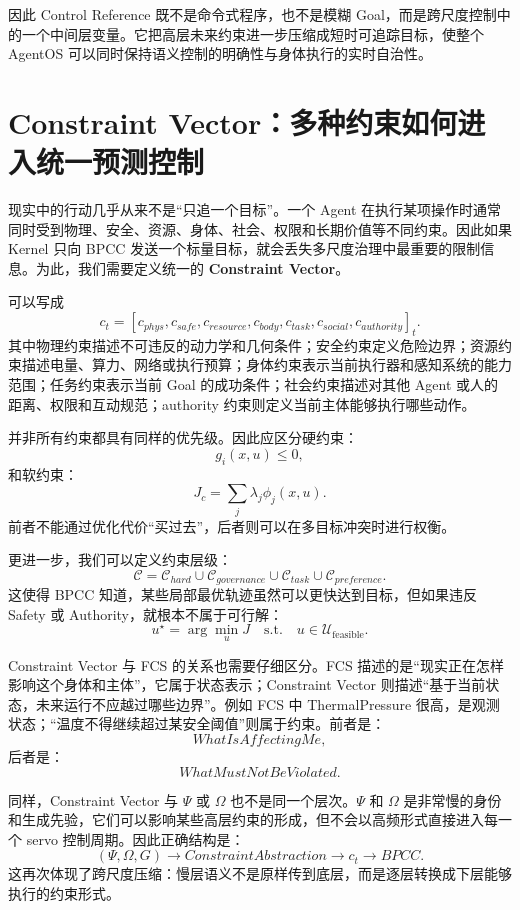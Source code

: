 因此 Control Reference 既不是命令式程序，也不是模糊 Goal，而是跨尺度控制中的一个中间层变量。它把高层未来约束进一步压缩成短时可追踪目标，使整个 AgentOS 可以同时保持语义控制的明确性与身体执行的实时自治性。

\section{Constraint Vector：多种约束如何进入统一预测控制}

现实中的行动几乎从来不是“只追一个目标”。一个 Agent 在执行某项操作时通常同时受到物理、安全、资源、身体、社会、权限和长期价值等不同约束。因此如果 Kernel 只向 BPCC 发送一个标量目标，就会丢失多尺度治理中最重要的限制信息。为此，我们需要定义统一的 \textbf{Constraint Vector}。

可以写成
\[
c_t=
\left[
c_{phys},
c_{safe},
c_{resource},
c_{body},
c_{task},
c_{social},
c_{authority}
\right]_t.
\]
其中物理约束描述不可违反的动力学和几何条件；安全约束定义危险边界；资源约束描述电量、算力、网络或执行预算；身体约束表示当前执行器和感知系统的能力范围；任务约束表示当前 Goal 的成功条件；社会约束描述对其他 Agent 或人的距离、权限和互动规范；authority 约束则定义当前主体能够执行哪些动作。

并非所有约束都具有同样的优先级。因此应区分硬约束：
\[
g_i(x,u)\leq0,
\]
和软约束：
\[
J_c
=
\sum_j\lambda_j
\phi_j(x,u).
\]
前者不能通过优化代价“买过去”，后者则可以在多目标冲突时进行权衡。

更进一步，我们可以定义约束层级：
\[
\mathcal C=
\mathcal C_{hard}
\cup
\mathcal C_{governance}
\cup
\mathcal C_{task}
\cup
\mathcal C_{preference}.
\]
这使得 BPCC 知道，某些局部最优轨迹虽然可以更快达到目标，但如果违反 Safety 或 Authority，就根本不属于可行解：
\[
u^\star
=
\arg\min_u J
\quad
\text{s.t.}\quad
u\in\mathcal U_{\mathrm{feasible}}.
\]

Constraint Vector 与 FCS 的关系也需要仔细区分。FCS 描述的是“现实正在怎样影响这个身体和主体”，它属于状态表示；Constraint Vector 则描述“基于当前状态，未来运行不应越过哪些边界”。例如 FCS 中 ThermalPressure 很高，是观测状态；“温度不得继续超过某安全阈值”则属于约束。前者是：
\[
WhatIsAffectingMe,
\]
后者是：
\[
WhatMustNotBeViolated.
\]

同样，Constraint Vector 与 $\Psi$ 或 $\Omega$ 也不是同一个层次。$\Psi$ 和 $\Omega$ 是非常慢的身份和生成先验，它们可以影响某些高层约束的形成，但不会以高频形式直接进入每一个 servo 控制周期。因此正确结构是：
\[
(\Psi,\Omega,G)
\rightarrow
ConstraintAbstraction
\rightarrow
c_t
\rightarrow
BPCC.
\]
这再次体现了跨尺度压缩：慢层语义不是原样传到底层，而是逐层转换成下层能够执行的约束形式。

